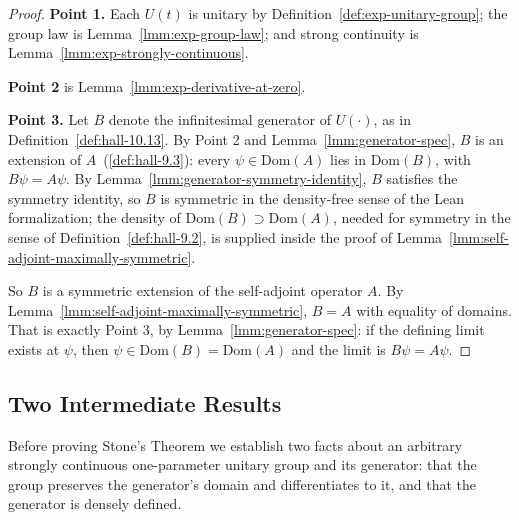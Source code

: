 \begin{proof}
    \leanok
\textbf{Point 1.} Each $U(t)$ is unitary by Definition~\ref{def:exp-unitary-group}; the group law is Lemma~\ref{lmm:exp-group-law}; and strong continuity is Lemma~\ref{lmm:exp-strongly-continuous}.

\textbf{Point 2} is Lemma~\ref{lmm:exp-derivative-at-zero}.

\textbf{Point 3.} Let $B$ denote the infinitesimal generator of $U(\cdot)$, as in Definition~\ref{def:hall-10.13}. By Point 2 and Lemma~\ref{lmm:generator-spec}, $B$ is an extension of $A$~(\ref{def:hall-9.3}): every $\psi \in \text{Dom}(A)$ lies in $\text{Dom}(B)$, with $B\psi = A\psi$. By Lemma~\ref{lmm:generator-symmetry-identity}, $B$ satisfies the symmetry identity, so $B$ is symmetric in the density-free sense of the Lean formalization; the density of $\text{Dom}(B) \supset \text{Dom}(A)$, needed for symmetry in the sense of Definition~\ref{def:hall-9.2}, is supplied inside the proof of Lemma~\ref{lmm:self-adjoint-maximally-symmetric}.

So $B$ is a symmetric extension of the self-adjoint operator $A$. By Lemma~\ref{lmm:self-adjoint-maximally-symmetric}, $B = A$ with equality of domains. That is exactly Point 3, by Lemma~\ref{lmm:generator-spec}: if the defining limit exists at $\psi$, then $\psi \in \text{Dom}(B) = \text{Dom}(A)$ and the limit is $B\psi = A\psi$.
\end{proof}

\subsection{Two Intermediate Results}
Before proving Stone's Theorem we establish two facts about an arbitrary strongly continuous one-parameter unitary group and its generator: that the group preserves the generator's domain and differentiates to it, and that the generator is densely defined.

